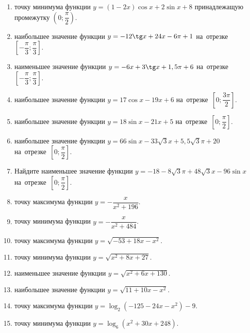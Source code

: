 \documentclass[a4paper,10pt]{article}
\begin{document}
\begin{enumerate}
\item {} точку минимума функции $y=\left(1-2x\right)\cos x +2\sin x+8$
принадлежащую промежутку $\left(0;\dfrac{\pi}{2}\right)$.

\item {} наибольшее значение функции $y=-12\tg x +24x-6\pi +1$ на~отрезке~$\left[-\dfrac{\pi}{3};\dfrac{\pi}{3}\right]$.

\item {} наименьшее значение функции $y=-6x +3\tg x+1,5\pi+6$ на~отрезке~$\left[-\dfrac{\pi}{3};\dfrac{\pi}{3}\right]$.

\item {} наибольшее значение функции $y=17\cos x-19x+6$ на~отрезке~$\left[0;\dfrac{3\pi}{2}\right]$.

\item {} наибольшее значение функции $y=18\sin x-21x+5$ на~отрезке~$\left[0;\dfrac{\pi}{2}\right]$.

\item {} наибольшее значение функции $y=66\sin x-33\sqrt{3}x+5,5\sqrt{3}\pi +20$ на~отрезке~$\left[0;\dfrac{\pi}{2}\right]$.

\item Найдите наименьшее значение функции $y=-18-8\sqrt{3}\pi+48\sqrt{3}x-96\sin x$ на~отрезке~$\left[0;\dfrac{\pi}{2}\right]$.

\item {} точку максимума функции $y=-\dfrac{x}{ x^2 +196}$.

\item {} точку минимума функции $y=-\dfrac{x}{ x^2 +484}$.

\item {} точку максимума функции $y=\sqrt{-53+18x-x^2}$.

\item {} точку минимума функции $y=\sqrt{x^2+8x+27}$.

\item {} наименьшее значение функции $y=\sqrt{x^2+6x+130}$.

\item {} наибольшее значение функции $y=\sqrt{11+10x-x^2}$.

\item {} точку максимума функции $y=\log_2\left(-125-24x-x^2\right)-9$.

\item {} точку минимума функции $y=\log_6\left(x^2+30x+248\right)$.


\end{enumerate}
\end{document}
